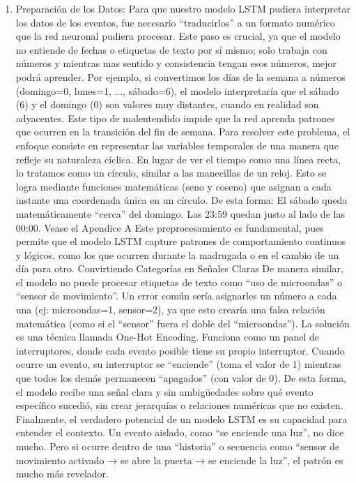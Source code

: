       \begin{enumerate}
            \item Preparación de los Datos:
                  Para que nuestro modelo LSTM pudiera interpretar los datos de los eventos, fue necesario ``traducirlos'' a un formato numérico que la red neuronal pudiera procesar. Este paso es crucial, ya que el modelo no entiende de fechas o etiquetas de texto por sí mismo; solo trabaja con números y mientras mas sentido y consistencia tengan esos números, mejor podrá aprender.
                  Por ejemplo, si convertimos los días de la semana a números (domingo=0, lunes=1, ..., sábado=6), el modelo interpretaría que el sábado (6) y el domingo (0) son valores muy distantes, cuando en realidad son adyacentes. Este tipo de malentendido impide que la red aprenda patrones que ocurren en la transición del fin de semana.
                  Para resolver este problema, el enfoque consiste en representar las variables temporales de una manera que refleje su naturaleza cíclica. En lugar de ver el tiempo como una línea recta, lo tratamos como un círculo, similar a las manecillas de un reloj. Esto se logra mediante funciones matemáticas (seno y coseno) que asignan a cada instante una coordenada única en un círculo. De esta forma:
                  El sábado queda matemáticamente ``cerca'' del domingo.
                  Las 23:59 quedan justo al lado de las 00:00. Vease el Apendice A
                  Este preprocesamiento es fundamental, pues permite que el modelo LSTM capture patrones de comportamiento continuos y lógicos, como los que ocurren durante la madrugada o en el cambio de un día para otro.
                  Convirtiendo Categorías en Señales Claras
                  De manera similar, el modelo no puede procesar etiquetas de texto como ``uso de microondas'' o ``sensor de movimiento''. Un error común sería asignarles un número a cada una (ej: microondas=1, sensor=2), ya que esto crearía una falsa relación matemática (como si el ``sensor'' fuera el doble del ``microondas'').
                  La solución es una técnica llamada One-Hot Encoding. Funciona como un panel de interruptores, donde cada evento posible tiene su propio interruptor.
                  Cuando ocurre un evento, su interruptor se ``enciende'' (toma el valor de 1) mientras que todos los demás permanecen ``apagados'' (con valor de 0). De esta forma, el modelo recibe una señal clara y sin ambigüedades sobre qué evento específico sucedió, sin crear jerarquías o relaciones numéricas que no existen.
                  Finalmente, el verdadero potencial de un modelo LSTM es su capacidad para entender el contexto. Un evento aislado, como ``se enciende una luz'', no dice mucho. Pero si ocurre dentro de una ``historia'' o secuencia como ``sensor de movimiento activado → se abre la puerta → se enciende la luz'', el patrón es mucho más revelador.

\end{enumerate}
